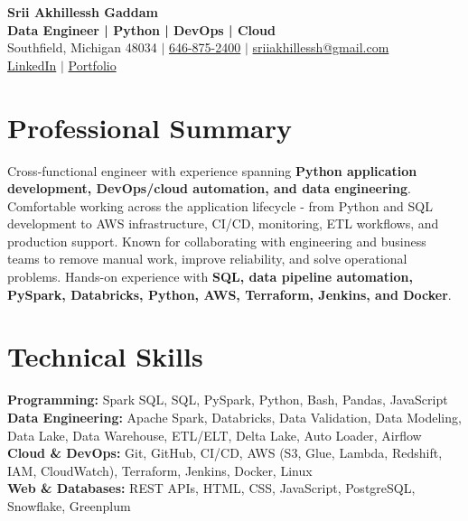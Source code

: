 \documentclass[letterpaper,10pt]{article}
\begin{document}
\fontsize{9.35pt}{10.45pt}\selectfont

\begin{center}
    {\LARGE \textbf{Srii Akhillessh Gaddam}} \\[-1pt]
    \textbf{Data Engineer | Python | DevOps | Cloud} \\[2pt]
    Southfield, Michigan 48034 $|$
    \href{tel:6468752400}{646-875-2400} $|$
    \href{mailto:sriiakhillessh@gmail.com}{sriiakhillessh@gmail.com} \\[1pt]
    \href{https://www.linkedin.com/in/srii-akhiilessh-gaddam-b48668191/}{LinkedIn} $|$
    \href{https://sriiakhillesshg.github.io/portfolio/}{Portfolio}
\end{center}
\vspace{-8pt}

\section{Professional Summary}
\small{Cross-functional engineer with experience spanning \textbf{Python application development, DevOps/cloud automation, and data engineering}. Comfortable working across the application lifecycle - from Python and SQL development to AWS infrastructure, CI/CD, monitoring, ETL workflows, and production support. Known for collaborating with engineering and business teams to remove manual work, improve reliability, and solve operational problems. Hands-on experience with \textbf{SQL, data pipeline automation, PySpark, Databricks, Python, AWS, Terraform, Jenkins, and Docker}.}

\section{Technical Skills}
\small{
\textbf{Programming:} Spark SQL, SQL, PySpark, Python, Bash, Pandas, JavaScript \\
\textbf{Data Engineering:} Apache Spark, Databricks, Data Validation, Data Modeling, Data Lake, Data Warehouse, ETL/ELT, Delta Lake, Auto Loader, Airflow \\
\textbf{Cloud \& DevOps:} Git, GitHub, CI/CD, AWS (S3, Glue, Lambda, Redshift, IAM, CloudWatch), Terraform, Jenkins, Docker, Linux \\
\textbf{Web \& Databases:} REST APIs, HTML, CSS, JavaScript, PostgreSQL, Snowflake, Greenplum
}
\end{document}
